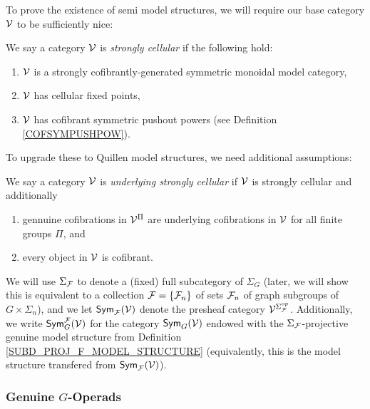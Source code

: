 \documentclass[a4paper,10pt]{article}%
\begin{document}
{\color{blue}
To prove the existence of semi model structures, we will require our base category $\mathcal V$ to be sufficiently nice:
\begin{definition}
  \label{STRONGLY_CELLULAR}
  We say a category $\mathcal V$ is \textit{strongly cellular} if the following hold: 
  \begin{enumerate} 
  \item $\mathcal V$ is a strongly cofibrantly-generated symmetric monoidal model category,
  \item $\mathcal V$ has cellular fixed points,
  \item $\mathcal V$ has cofibrant symmetric pushout powers (see Definition \ref{COFSYMPUSHPOW}).
  \end{enumerate} 
\end{definition} 
To upgrade these to Quillen model structures, we need additional assumptions:
\begin{definition}
  \label{UNDERLYING_STRONGLY_CELLULAR}
  We say a category $\mathcal V$ is \textit{underlying strongly cellular} if $\mathcal V$ is strongly cellular and additionally
  \begin{enumerate}
  \item gennuine cofibrations in $\mathcal V^\Pi$ are underlying cofibrations in $\mathcal V$ for all finite groups $\Pi$, and
  \item every object in $\mathcal V$ is cofibrant.
  \end{enumerate}
\end{definition}
}

\begin{notation}
  We will use $\Sigma_{\mathcal F}$ to denote a (fixed) full subcategory of $\Sigma_G$ (later, we will show this is equivalent to a collection $\mathcal F = \left\{\mathcal F_n\right\}$ of sets $\mathcal F_n$ of graph subgroups of $G\times \Sigma_n$), and we let $\mathsf{Sym}_{\mathcal F}(\mathcal V)$ denote the presheaf category $\mathcal V^{\Sigma_{\mathcal F}^{op}}$. 
  Additionally, we write $\mathsf{Sym}_G^{\mathcal F}(\mathcal V)$ for the category $\mathsf{Sym}_G(\mathcal V)$ endowed with the $\Sigma_{\mathcal F}$-projective genuine model structure from Definition \ref{SUBD_PROJ_F_MODEL_STRUCTURE} (equivalently, this is the model structure transfered from $\mathsf{Sym}_{\mathcal F}(\mathcal V)$).
\end{notation}



\subsubsection{Genuine $G$-Operads}
\label{OP_G_EXISTS_SECTION}
\end{document}
